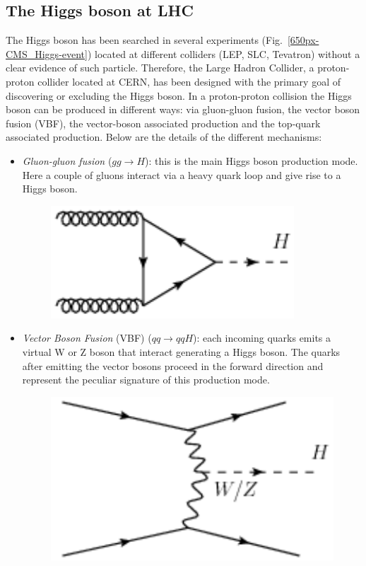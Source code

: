 \subsection*{The Higgs boson at LHC}
The Higgs boson  has been searched in several experiments (Fig.~\ref{650px-CMS_Higgs-event}) located  at different  colliders (LEP, SLC, Tevatron) without a clear evidence of such particle.
Therefore,  the Large Hadron Collider, a  proton-proton collider located at CERN,  has been designed with the primary goal of discovering or excluding the Higgs 
boson. 
In a proton-proton collision the Higgs boson can be produced in different ways: via gluon-gluon fusion, the vector boson fusion (VBF), the vector-boson associated production and the top-quark associated production. Below are the details of the different mechanisms:
\begin{itemize}
\item \textit{Gluon-gluon fusion} ($gg \rightarrow H$): this is the main Higgs boson production mode. Here a couple of gluons interact via a heavy quark loop and give rise to a Higgs boson.
\begin{figure}[h]
\centering
\vspace{0.5cm}
\includegraphics[scale= 0.7]{../Cap1/gg}
\end{figure}
\item \textit{Vector Boson Fusion} (VBF) ($qq \rightarrow qqH$): each incoming quarks emits a virtual W or Z boson that interact generating a Higgs boson.
The quarks after emitting the vector bosons proceed in the forward direction and represent the peculiar signature of this production mode.
\begin{figure}[h]
\centering
\vspace{1cm}
\includegraphics[scale= 0.6]{../Cap1/vbf}

\end{figure}
\end{itemize}

